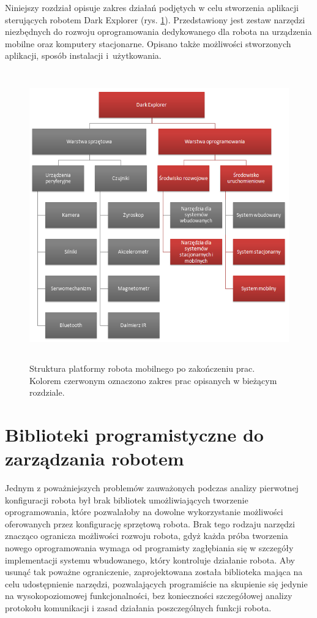 Niniejszy rozdział opisuje zakres działań podjętych w celu stworzenia aplikacji
sterujących robotem Dark Explorer (rys. \ref{fig:DarkExplorerPlatformStacMob}). Przedstawiony jest
zestaw narzędzi niezbędnych do rozwoju oprogramowania dedykowanego dla robota na urządzenia mobilne oraz
komputery stacjonarne. Opisano także możliwości stworzonych aplikacji, sposób
instalacji i~użytkowania.

\begin{figure}[!ht]
 \centering
 \includegraphics[height=125mm]{../images/ch03/dark_explorer_platform_ide_stac_mob.png}
 \caption{Struktura platformy robota mobilnego po zakończeniu prac. Kolorem
 czerwonym oznaczono zakres prac opisanych w bieżącym rozdziale.}
 \label{fig:DarkExplorerPlatformStacMob}
\end{figure}

\section{Biblioteki programistyczne do zarządzania robotem}
Jednym z poważniejszych problemów zauważonych podczas analizy pierwotnej
konfiguracji robota był brak bibliotek umożliwiających tworzenie oprogramowania,
które pozwalałoby na dowolne wykorzystanie możliwości oferowanych przez
konfigurację sprzętową robota. Brak tego rodzaju narzędzi znacząco ogranicza
możliwości rozwoju robota, gdyż każda próba tworzenia nowego oprogramowania wymaga
od programisty zagłębiania się w szczegóły implementacji systemu wbudowanego,
który kontroluje działanie robota. Aby usunąć tak poważne ograniczenie,
zaprojektowana została biblioteka mająca na celu udostępnienie narzędzi,
pozwalających programiście na skupienie się jedynie na wysokopoziomowej
funkcjonalności, bez konieczności szczegółowej analizy protokołu komunikacji i
zasad działania poszczególnych funkcji robota.

